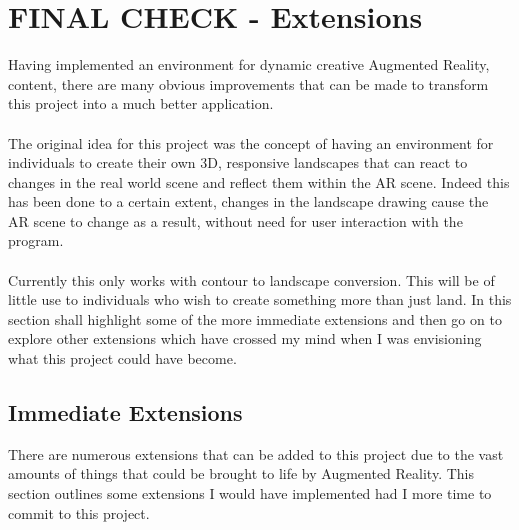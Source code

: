 \documentclass[11pt]{article}
\begin{document}
\section{FINAL CHECK - Extensions}
\label{chapter:extensions}
Having implemented an environment for dynamic creative Augmented Reality,
content, there are many obvious improvements that can be made to transform 
this project into a much better application. \\
\\
The original idea for this project was the concept of having an environment
for individuals to create their own 3D, responsive landscapes that can react
to changes in the real world scene and reflect them within the AR scene. Indeed
this has been done to a certain extent, changes in the landscape drawing cause
the AR scene to change as a result, without need for user interaction with the
program.\\
\\
Currently this only works with contour to landscape conversion. This
will be of little use to individuals who wish to create something more 
than just land. In this section shall highlight some of the more 
immediate extensions and then go on to explore other extensions 
which have crossed my mind when I was envisioning what 
this project could have become.

\subsection{Immediate Extensions}
There are numerous extensions that can be added to this project due to the 
vast amounts of things that could be brought to life by Augmented Reality.
This section outlines some extensions I would have implemented had I
more time to commit to this project.
\end{document}
